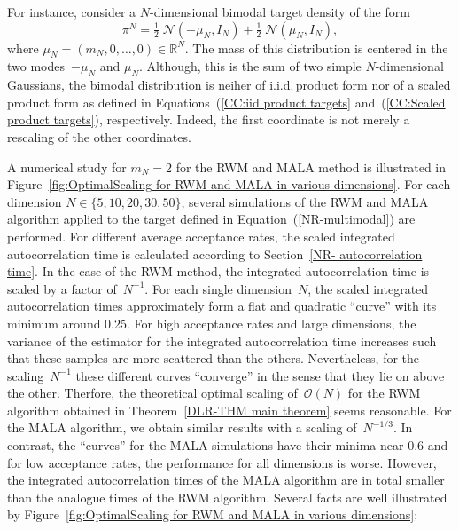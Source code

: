 For instance, consider a $N$-dimensional bimodal target density of the form
\begin{equation}
 \label{NR-multimodal}
 \pi^{N} = \tfrac{1}{2} \; \mathcal{N}(-\mu_N, I_N ) +  \tfrac{1}{2} \; \mathcal{N}(\mu_N, I_N ),
\end{equation}
where $\mu_N = (m_N, 0, \dots, 0) \in \mathbb{R}^N$. The mass of this distribution is centered in the two modes~$-\mu_N$ and $\mu_N$. Although, this is the sum of two simple $N$-dimensional Gaussians, the bimodal distribution is neiher of i.i.d.\,product form nor of a scaled product form as defined in Equations~(\ref{CC:iid product targets} and~(\ref{CC:Scaled product targets}), respectively. Indeed, the first coordinate is not merely a rescaling of the other coordinates. 


A numerical study for $m_N = 2$ for the RWM and MALA method is illustrated in Figure~\ref{fig:OptimalScaling for RWM and MALA in various dimensions}. For each dimension $N \in \{ 5, 10, 20, 30, 50 \}$, several simulations of the RWM and MALA algorithm applied to the target defined in Equation~(\ref{NR-multimodal}) are performed. For different average acceptance rates, the scaled integrated autocorrelation time is calculated according to Section~\ref{NR- autocorrelation time}. In the case of the RWM method, the integrated autocorrelation time is scaled by a factor of~$N^{-1}$.  For each single dimension~$N$, the scaled integrated autocorrelation times approximately form a flat and quadratic ``curve'' with its minimum around 0.25. For high acceptance rates and large dimensions, the variance of the estimator for the integrated autocorrelation time increases such that these samples are more scattered than the others. Nevertheless, for the scaling~$N^{-1}$ these different curves ``converge'' in the sense that they lie on above the other. Therfore, the theoretical optimal scaling of~$\mathcal{O}(N)$ for the RWM algorithm obtained in Theorem~\ref{DLR-THM main theorem} seems reasonable. For the MALA algorithm, we obtain similar results with a scaling of~$N^{-1/3}$. In contrast, the ``curves'' for the MALA simulations have their minima near 0.6 and for low acceptance rates, the performance for all dimensions is worse. However, the integrated autocorrelation times of the MALA algorithm are in total smaller than the analogue times of the RWM algorithm. Several facts are well illustrated by Figure~\ref{fig:OptimalScaling for RWM and MALA in various dimensions}:
